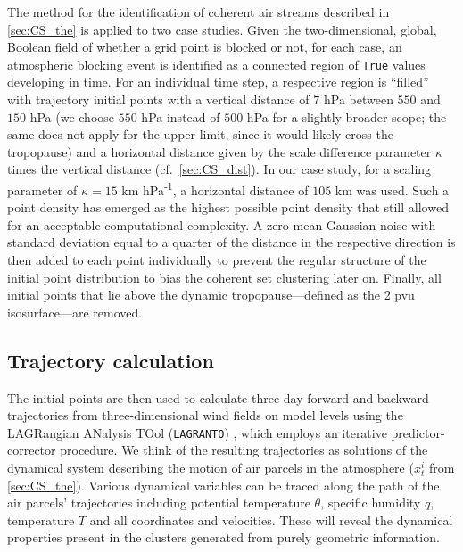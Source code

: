 The method for the identification of coherent air streams described in \cref{sec:CS_the} is applied to two case studies. Given the two-dimensional, global, Boolean field of whether a grid point is blocked or not, for each case, an atmospheric blocking event is identified as a connected region of \texttt{True} values developing in time. For an individual time step, a respective region is \enquote{filled} with trajectory initial points with a vertical distance of $7$ hPa between $550$ and $150$ hPa (we choose $550$ hPa instead of $500$ hPa for a slightly broader scope; the same does not apply for the upper limit, since it would likely cross the tropopause) and a horizontal distance given by the scale difference parameter $\kappa$ times the vertical distance (cf.~\cref{sec:CS_dist}). In our case study, for a scaling parameter of $\kappa = 15$ km hPa\textsuperscript{-1}, a horizontal distance of $105$ km was used. Such a point density has emerged as the highest possible point density that still allowed for an acceptable computational complexity. A zero-mean Gaussian noise with standard deviation equal to a quarter of the distance in the respective direction is then added to each point individually to prevent the regular structure of the initial point distribution to bias the coherent set clustering later on. Finally, all initial points that lie above the dynamic tropopause---defined as the 2 \gls{pvu} isosurface---are removed.

\subsection{Trajectory calculation}
The initial points are then used to calculate three-day forward and backward trajectories from three-dimensional wind fields on model levels using the LAGRangian ANalysis TOol (\texttt{LAGRANTO}) \parencite{sprengerLAGRANTOLagrangianAnalysis2015}, which employs an iterative predictor-corrector procedure. We think of the resulting trajectories as solutions of the dynamical system describing the motion of air parcels in the atmosphere ($x_t^i$ from \cref{sec:CS_the}). Various dynamical variables can be traced along the path of the air parcels' trajectories including potential temperature $\theta$, specific humidity $q$, temperature $T$ and all coordinates and velocities. These will reveal the dynamical properties present in the clusters generated from purely geometric information.

